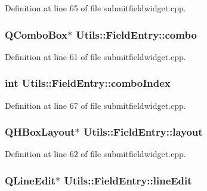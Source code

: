 \-Definition at line 65 of file submitfieldwidget.\-cpp.

\hypertarget{struct_utils_1_1_field_entry_abd2511ae13715dedb73f5eacf4228cb2}{
\subsubsection[{combo}]{\setlength{\rightskip}{0pt plus 5cm}\-Q\-Combo\-Box$\ast$ {\bf \-Utils\-::\-Field\-Entry\-::combo}}}\label{struct_utils_1_1_field_entry_abd2511ae13715dedb73f5eacf4228cb2}


\-Definition at line 61 of file submitfieldwidget.\-cpp.

\hypertarget{struct_utils_1_1_field_entry_a98cf51959e982fb59e83a1185d5f382b}{
\subsubsection[{combo\-Index}]{\setlength{\rightskip}{0pt plus 5cm}int {\bf \-Utils\-::\-Field\-Entry\-::combo\-Index}}}\label{struct_utils_1_1_field_entry_a98cf51959e982fb59e83a1185d5f382b}


\-Definition at line 67 of file submitfieldwidget.\-cpp.

\hypertarget{struct_utils_1_1_field_entry_a1e7b88dcc6013fd6eebdea1d52a0192b}{
\subsubsection[{layout}]{\setlength{\rightskip}{0pt plus 5cm}\-Q\-H\-Box\-Layout$\ast$ {\bf \-Utils\-::\-Field\-Entry\-::layout}}}\label{struct_utils_1_1_field_entry_a1e7b88dcc6013fd6eebdea1d52a0192b}


\-Definition at line 62 of file submitfieldwidget.\-cpp.

\hypertarget{struct_utils_1_1_field_entry_a5fb5e049e448a5e053854ee97ae92e01}{
\subsubsection[{line\-Edit}]{\setlength{\rightskip}{0pt plus 5cm}\-Q\-Line\-Edit$\ast$ {\bf \-Utils\-::\-Field\-Entry\-::line\-Edit}}}\label{struct_utils_1_1_field_entry_a5fb5e049e448a5e053854ee97ae92e01}


